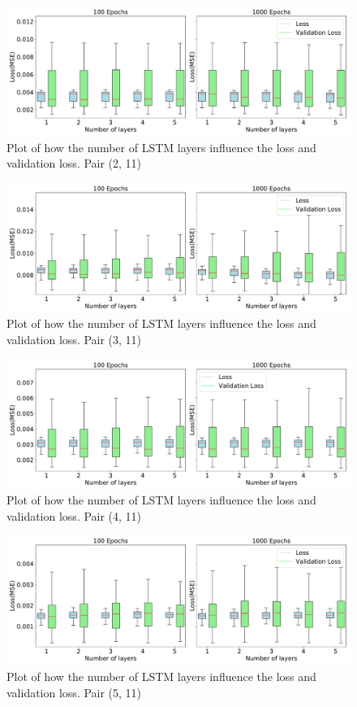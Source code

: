 	\begin{figure}[H]
		\centering
		\includegraphics[width=1\linewidth]{Pictures/Results/experiment_3_2}
		\caption{Plot of how the number of LSTM layers influence the loss and validation loss. Pair (2, 11)}
		\label{fig:experiment_3_2}
	\end{figure}
	\begin{figure}[H]
		\centering
		\includegraphics[width=1\linewidth]{Pictures/Results/experiment_3_3}
		\caption{Plot of how the number of LSTM layers influence the loss and validation loss. Pair (3, 11)}
		\label{fig:experiment_3_3}
	\end{figure}
	\begin{figure}[H]
		\centering
		\includegraphics[width=1\linewidth]{Pictures/Results/experiment_3_4}
		\caption{Plot of how the number of LSTM layers influence the loss and validation loss. Pair (4, 11)}
		\label{fig:experiment_3_4}
	\end{figure}
	\begin{figure}[H]
		\centering
		\includegraphics[width=1\linewidth]{Pictures/Results/experiment_3_5}
		\caption{Plot of how the number of LSTM layers influence the loss and validation loss. Pair (5, 11)}
		\label{fig:experiment_3_5}
	\end{figure}


